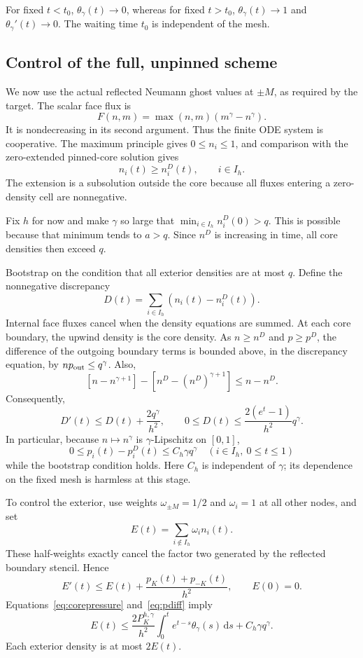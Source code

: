 \documentclass[11pt,a4paper]{article}
\theoremstyle{remark}
\newcommand{\dd}{\,\mathrm d}
\begin{document}
For fixed $t<t_0$, $\theta_\gamma(t)\to0$, whereas for fixed $t>t_0$, $\theta_\gamma(t)\to1$ and $\theta_\gamma'(t)\to0$. The waiting time $t_0$ is independent of the mesh.

\subsection{Control of the full, unpinned scheme}

We now use the actual reflected Neumann ghost values at $\pm M$, as required by the target. The scalar face flux is
\[
 F(n,m)=\max(n,m)(m^\gamma-n^\gamma).
\]
It is nondecreasing in its second argument. Thus the finite ODE system is cooperative. The maximum principle gives $0\le n_i\le1$, and comparison with the zero-extended pinned-core solution gives
\begin{equation}\label{eq:comparison}
 n_i(t)\ge n_i^D(t),\qquad i\in I_h.
\end{equation}
The extension is a subsolution outside the core because all fluxes entering a zero-density cell are nonnegative.

Fix $h$ for now and make $\gamma$ so large that $\min_{i\in I_h}n_i^D(0)>q$. This is possible because that minimum tends to $a>q$. Since $n^D$ is increasing in time, all core densities then exceed $q$.

Bootstrap on the condition that all exterior densities are at most $q$. Define the nonnegative discrepancy
\[
 D(t)=\sum_{i\in I_h}(n_i(t)-n_i^D(t)).
\]
Internal face fluxes cancel when the density equations are summed. At each core boundary, the upwind density is the core density. As $n\ge n^D$ and $p\ge p^D$, the difference of the outgoing boundary terms is bounded above, in the discrepancy equation, by $n p_{\rm out}\le q^\gamma$. Also,
\[
 [n-n^{\gamma+1}]-[n^D-(n^D)^{\gamma+1}]\le n-n^D.
\]
Consequently,
\begin{equation}\label{eq:D-bound}
 D'(t)\le D(t)+\frac{2q^\gamma}{h^2},\qquad
 0\le D(t)\le \frac{2(e^t-1)}{h^2}q^\gamma.
\end{equation}
In particular, because $n\mapsto n^\gamma$ is $\gamma$-Lipschitz on $[0,1]$,
\begin{equation}\label{eq:pdiff}
 0\le p_i(t)-p_i^D(t)\le C_h\gamma q^\gamma\quad(i\in I_h,
 \ 0\le t\le1)
\end{equation}
while the bootstrap condition holds. Here $C_h$ is independent of $\gamma$; its dependence on the fixed mesh is harmless at this stage.

To control the exterior, use weights $\omega_{\pm M}=1/2$ and $\omega_i=1$ at all other nodes, and set
\[
 E(t)=\sum_{i\notin I_h}\omega_i n_i(t).
\]
These half-weights exactly cancel the factor two generated by the reflected boundary stencil. Hence
\[
 E'(t)\le E(t)+\frac{p_K(t)+p_{-K}(t)}{h^2},\qquad E(0)=0.
\]
Equations~\eqref{eq:corepressure} and~\eqref{eq:pdiff} imply
\begin{equation}\label{eq:Ebound}
 E(t)\le \frac{2P_K^{h,\gamma}}{h^2}
 \int_0^t e^{t-s}\theta_\gamma(s)\dd s+C_h\gamma q^\gamma.
\end{equation}
Each exterior density is at most $2E(t)$.
\end{document}
